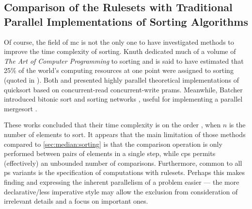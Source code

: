 
\subsection{Comparison of the  Rulesets with Traditional Parallel Implementations of Sorting Algorithms}

Of course, the field of \gls{mc} is not the only one to have investigated methods to improve the time complexity of sorting.  Knuth dedicated much of a volume of \textit{The Art of Computer Programming} to sorting \cite{Knuth1998} and is said to have estimated that 25\% of the world's computing resources at one point were assigned to sorting (quoted in \cite{Powers1991}).  Both \citeauthor{Powers1991} \cite{Powers1991} and \citeauthor{Chlebus1991} \cite{Chlebus1991} presented highly parallel theoretical implementations of quicksort based on concurrent-read concurrent-write \glspl{pram}.  Meanwhile, Batcher introduced bitonic sort and sorting networks \cite{Akl2011}, useful for implementing a parallel mergesort \cite{Lee1995}.

These works concluded that their time complexity is on the order , when \(n\) is the number of elements to sort.  It appears that the main limitation of those methods compared to \cref{sec:median:sorting} is that the comparison operation is only performed between pairs of elements in a single step, while \gls{cps} permits (effectively) an unbounded number of comparisons.  Furthermore, common to all \gls{ps} variants is the specification of computations with \glspl{ruleset}.  Perhaps this makes finding and expressing the inherent parallelism of a problem easier --- the more declarative/less imperative style may allow the exclusion from consideration of irrelevant details and a focus on important ones.